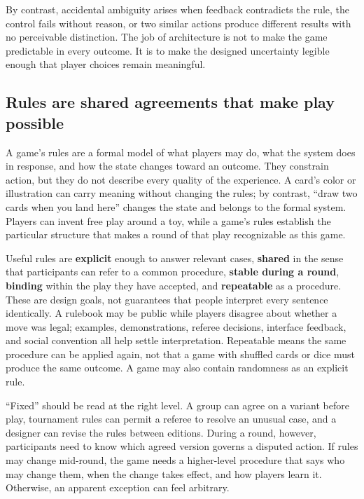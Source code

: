 By contrast, accidental ambiguity arises when feedback contradicts the rule, the control fails without reason, or two similar actions produce different results with no perceivable distinction. The job of architecture is not to make the game predictable in every outcome. It is to make the designed uncertainty legible enough that player choices remain meaningful.

\subsection{Rules are shared agreements that make play possible}\label{05-engine-i-ch009-rules-are-shared-agreements-that-make-play-possible}

A game's rules are a formal model of what players may do, what the system does in response, and how the state changes toward an outcome. They constrain action, but they do not describe every quality of the experience. A card's color or illustration can carry meaning without changing the rules; by contrast, ``draw two cards when you land here'' changes the state and belongs to the formal system. Players can invent free play around a toy, while a game's rules establish the particular structure that makes a round of that play recognizable as this game.

Useful rules are \textbf{explicit} enough to answer relevant cases, \textbf{shared} in the sense that participants can refer to a common procedure, \textbf{stable during a round}, \textbf{binding} within the play they have accepted, and \textbf{repeatable} as a procedure. These are design goals, not guarantees that people interpret every sentence identically. A rulebook may be public while players disagree about whether a move was legal; examples, demonstrations, referee decisions, interface feedback, and social convention all help settle interpretation. Repeatable means the same procedure can be applied again, not that a game with shuffled cards or dice must produce the same outcome. A game may also contain randomness as an explicit rule.

``Fixed'' should be read at the right level. A group can agree on a variant before play, tournament rules can permit a referee to resolve an unusual case, and a designer can revise the rules between editions. During a round, however, participants need to know which agreed version governs a disputed action. If rules may change mid-round, the game needs a higher-level procedure that says who may change them, when the change takes effect, and how players learn it. Otherwise, an apparent exception can feel arbitrary.

